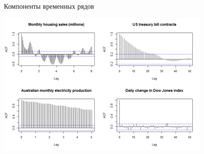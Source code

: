 \documentclass[9pt,pdf,utf8,hyperref={unicode},aspectratio=169]{beamer}
\begin{document}
\begin{frame}{Компоненты временных рядов}
{%
		\begin{center}
			\includegraphics[width=0.8\textwidth]{acfs.png}
		\end{center}		
	}
\end{frame}
\end{document}
